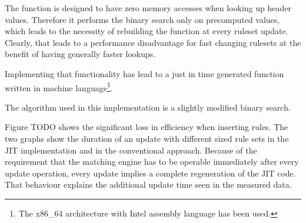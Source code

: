 \documentclass[a4paper,
		12pt,
		parskip=full,
		titlepage
		]{scrartcl}
\begin{document}
The function is designed to have zero memory accesses when looking up header values.
Therefore it performs the binary search only on precomputed values, which leads to the necessity of rebuilding the function at every ruleset update.
Clearly, that leads to a performance disadvantage for fast changing rulesets at the benefit of having generally faster lookups.

Implementing that functionality has lead to a just in time generated function written in machine language\footnote{The x86\_64 architecture with Intel assembly language has been used.}.

The algorithm used in this implementation is a slightly modified binary search.

Figure TODO shows the significant loss in efficiency when inserting rules. %
The two graphs show the duration of an update with different sized rule sets in the JIT implementation and in the conventional approach.
Because of the requirement that the matching engine has to be operable immediately after every update operation, every update implies a complete regeneration of the JIT code.
That behaviour explains the additional update time seen in the measured data. 

\newpage
{}


\end{document}
